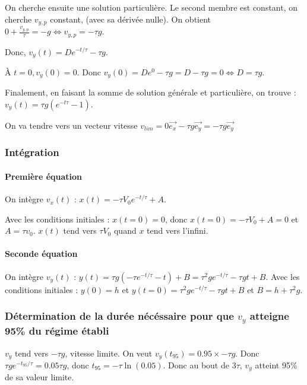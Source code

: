 \documentclass[french]{yLectureNote}
\renewcommand{\vec}{\overrightarrow}
\begin{document}
On cherche ensuite une solution particulière. Le second membre est constant, on cherche $v_{y,p}$ constant, (avec sa dérivée nulle). On obtient $0 + \frac{v_{y,p}}{\tau} = -g \iff v_{y,p} = -\tau g$.

Donc, $v_y(t) = De^{-t/\tau} - \tau g$.

À $t=0, v_y(0)=0$. Donc $v_y(0) = De^0-\tau g = D-\tau g = 0 \iff D = \tau g$.

Finalement, en faisant la somme de solution générale et particulière, on trouve : $v_y(t) = \tau g(e^{-t\tau}-1)$.

On va tendre vers un vecteur vitesse $v_{lim} = 0\vec{e_x} -\tau g \vec{e_y} = -\tau g \vec{e_y}$

\subsubsection{Intégration}
\paragraph{Première équation}
On intègre $v_x(t)$ : $x(t) = -\tau V_0e^{-t/\tau} + A$.

Avec les conditions initiales : $x(t=0) = 0$, donc $x(t=0) = -\tau V_0+A = 0 $ et $A = \tau v_0$. $x(t)$ tend vers $\tau V_0$ quand $x$ tend vers l'infini.
\paragraph{Seconde équation}
On intègre $v_y(t)$ : $y(t) = \tau g(-\tau e^{-t/\tau}-t) + B = \tau^2ge^{-t/\tau}-\tau g t + B$. Avec les conditions initiales : $y(0) = h$ et $y(t=0) = \tau^2ge^{-t/\tau}-\tau g t + B$ et $B = h + \tau^2g$.
\subsubsection{Détermination de la durée nécéssaire pour que $v_y$ atteigne 95\% du régime établi}

$v_y$ tend vers $-\tau g$, vitesse limite. On veut $v_y(t_{95}) =0.95\times -\tau g$. Donc $\tau g e^{-t_{95}/\tau} = 0.05\tau g$, donc $t_{95} = -\tau \ln(0.05)$. Donc au bout de $3\tau$, $v_y$ atteint 95\% de sa valeur limite.
\end{document}
